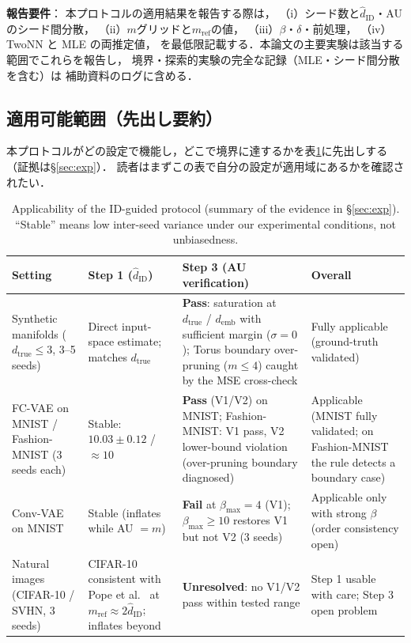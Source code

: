 \documentclass[11pt,a4paper]{jsarticle}
\newcommand{\hatdID}{\hat{d}_{\mathrm{ID}}}
\newcommand{\dtrue}{d_{\mathrm{true}}}
\newcommand{\demb}{d_{\mathrm{emb}}}
\begin{document}
\textbf{報告要件}：
本プロトコルの適用結果を報告する際は，
（i）シード数と$\hatdID$・AU のシード間分散，
（ii）$m$グリッドと$m_{\mathrm{ref}}$の値，
（iii）$\beta$・$\delta$・前処理，
（iv）TwoNN と MLE の両推定値，
を最低限記載する．本論文の主要実験は該当する範囲でこれらを報告し，
境界・探索的実験の完全な記録（MLE・シード間分散を含む）は
補助資料のログに含める．

\subsection{適用可能範囲（先出し要約）}\label{sec:protocol_applicability}

本プロトコルがどの設定で機能し，どこで境界に達するかを表\ref{tab:applicability}に先出しする
（証拠は§\ref{sec:exp}）．
読者はまずこの表で自分の設定が適用域にあるかを確認されたい．

\begin{table}[H]
\centering
\caption{Applicability of the ID-guided protocol (summary of the evidence in
§\ref{sec:exp}). ``Stable'' means low inter-seed variance under our
experimental conditions, not unbiasedness.}
\label{tab:applicability}
\small
\begin{tabular}{p{3.0cm}p{3.2cm}p{3.4cm}p{4.2cm}}
\toprule
Setting & Step 1 ($\hatdID$) & Step 3 (AU verification) & Overall \\
\midrule
Synthetic manifolds ($\dtrue \leq 3$, 3--5 seeds) & Direct input-space estimate; matches $\dtrue$ & \textbf{Pass}: saturation at $\dtrue$ / $\demb$ with sufficient margin ($\sigma = 0$); Torus boundary over-pruning ($m \leq 4$) caught by the MSE cross-check & Fully applicable (ground-truth validated) \\
\addlinespace
FC-VAE on MNIST / Fashion-MNIST (3 seeds each) & Stable: $10.03 \pm 0.12$ / $\approx 10$ & \textbf{Pass} (V1/V2) on MNIST; Fashion-MNIST: V1 pass, V2 lower-bound violation (over-pruning boundary diagnosed) & Applicable (MNIST fully validated; on Fashion-MNIST the rule detects a boundary case) \\
\addlinespace
Conv-VAE on MNIST & Stable (inflates while AU $= m$) & \textbf{Fail} at $\beta_{\max} = 4$ (V1); $\beta_{\max} \geq 10$ restores V1 but not V2 (3 seeds) & Applicable only with strong $\beta$ (order consistency open) \\
\addlinespace
Natural images (CIFAR-10 / SVHN, 3 seeds) & CIFAR-10 consistent with Pope et al.~\cite{pope2021intrinsic} at $m_{\mathrm{ref}} \approx 2\hatdID$; inflates beyond & \textbf{Unresolved}: no V1/V2 pass within tested range & Step 1 usable with care; Step 3 open problem \\
\bottomrule
\end{tabular}
\end{table}
\end{document}
